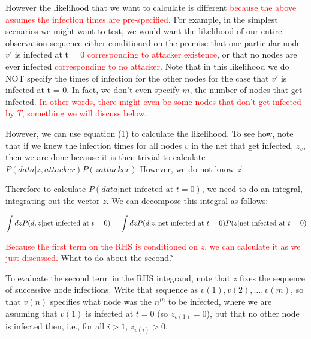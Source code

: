 \documentclass{article}
\begin{document}
	However the likelihood that we want to calculate is different 
	\textcolor{red}{because the above assumes the infection times are pre-specified.} 
        For example, in the simplest scenarios we might want
	to test, we would want the likelihood of our entire observation
	sequence either conditioned on the premise that one particular node
	$v'$ is infected at t = 0 \textcolor{red}{corresponding to attacker existence}, or that
	no nodes are ever infected \textcolor{red}{corresponding to no attacker}. Note
	that in this likelihood we do NOT specify the times of infection for
	the other nodes for the case that $v'$ is infected at t = 0. In fact,
	we don't even specify $m$, the number of nodes that get infected. 
	\textcolor{red}{In other words, there might even be some nodes that don't get 
        infected by $T$, something we will discuss below.}

	
	However, we can use equation (1) to calculate the likelihood. To see how, note that
        if we knew the infection times for all nodes $v$ in the net that get infected, 
        $z_{v}$, then we are done because it is then trivial to calculate 
        $P(data|z, attacker)P(z attacker)$ %
        However, we do not know $\vec{z}$

	Therefore to calculate $P(data  | \text{net infected at } t = 0)$, we need to do an
	integral, integrating out the vector $z$. We can
	decompose this integral as follows:

	\begin{equation}
	   \int dz P(d, z | \text{net infected at } t = 0) = \\
       	\int dz P(d | z, \text{net infected at } t = 0) P(z | \text{net infected at } t=0)
	\end{equation}
	
	\textcolor{red}{Because the first term on the RHS is conditioned on $z$, we can 
	calculate it as we just discussed.} What to do about the second?

	To evaluate the second term in the RHS integrand, note that $z$ fixes
	the sequence of successive node infections. Write that sequence as
	$v(1), v(2), \ldots, v(m)$, so that $v(n)$ specifies what node was the $n^{th}$
	to be infected, where we are assuming that $v(1)$ is infected at $t = 0$ (so
	$z_{v(1)} = 0$), but that no other node is infected then, i.e., for all 
	$i > 1$, $z_{v(i)} > 0$.
\end{document}
